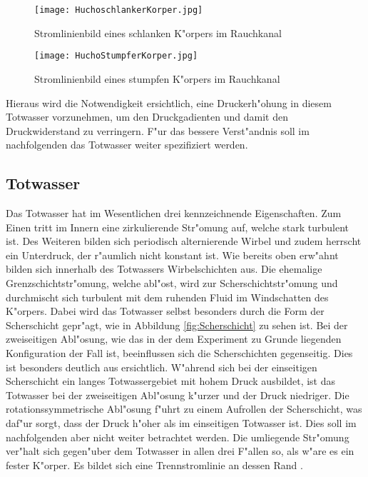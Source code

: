 \begin{figure}[h]
	\centering
	\texttt{[image: HuchoschlankerKorper.jpg]}
	\caption{Stromlinienbild eines schlanken K"orpers im Rauchkanal \cite{Hucho.2011}}
	\label{fig:HuchoSchlank}
\end{figure}

\begin{figure}[h]
	\centering
	\texttt{[image: HuchoStumpferKorper.jpg]}
	\caption{Stromlinienbild eines stumpfen K"orpers im Rauchkanal \cite{Hucho.2011}}
	\label{fig:HuchoStumpf}
\end{figure}

Hieraus wird die Notwendigkeit ersichtlich, eine Druckerh"ohung in diesem Totwasser vorzunehmen, um den Druckgadienten und damit den Druckwiderstand zu verringern. F"ur das bessere Verst"andnis soll im nachfolgenden das Totwasser weiter spezifiziert werden.

\subsection{Totwasser}
\label{sec:Totwasser}
Das Totwasser hat im Wesentlichen drei kennzeichnende Eigenschaften. Zum Einen tritt im Innern eine zirkulierende Str"omung auf, welche stark turbulent ist. Des Weiteren bilden sich periodisch alternierende Wirbel und zudem herrscht ein Unterdruck, der r"aumlich nicht konstant ist. 
Wie bereits oben erw"ahnt bilden sich innerhalb des Totwassers Wirbelschichten aus. Die ehemalige Grenzschichtstr"omung, welche abl"ost, wird zur Scherschichtstr"omung und durchmischt sich turbulent mit dem ruhenden Fluid im Windschatten des K"orpers. Dabei wird das Totwasser selbst besonders durch die Form der Scherschicht gepr"agt, wie in Abbildung \ref{fig:Scherschicht} zu sehen ist. Bei der zweiseitigen Abl"osung, wie das in der dem Experiment zu Grunde liegenden Konfiguration der Fall ist, beeinflussen sich die Scherschichten gegenseitig. Dies ist besonders deutlich aus  ersichtlich. W"ahrend sich bei der einseitigen Scherschicht ein langes Totwassergebiet mit hohem Druck ausbildet, ist das Totwasser bei der zweiseitigen Abl"osung k"urzer und der Druck niedriger. Die rotationssymmetrische Abl"osung f"uhrt zu einem Aufrollen der Scherschicht, was daf"ur sorgt, dass der Druck h"oher als im einseitigen Totwasser ist. Dies soll im nachfolgenden aber nicht weiter betrachtet werden. Die umliegende Str"omung ver"halt sich gegen"uber dem Totwasser in allen drei F"allen so, als w"are es  ein fester K"orper. Es bildet sich eine Trennstromlinie an dessen Rand \cite{Hucho.2011}. 

